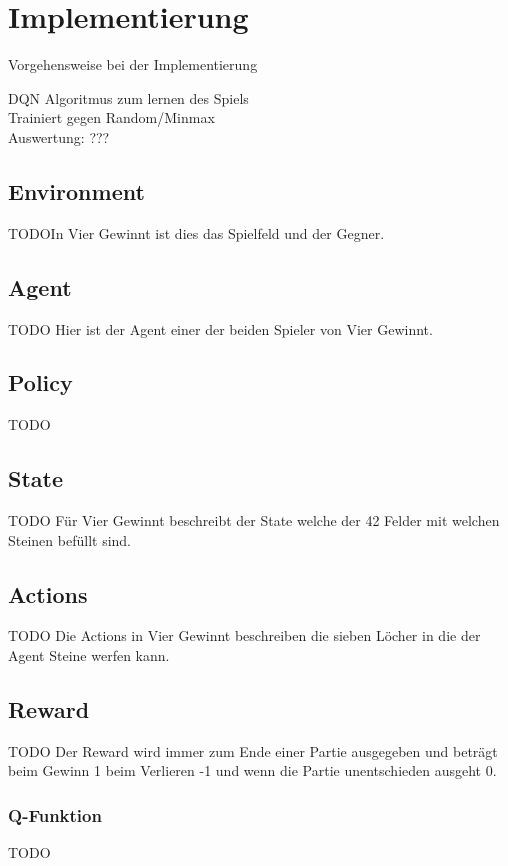 \chapter{Implementierung}%

\label{cha:Implementierung}

Vorgehensweise bei der Implementierung

\colorbox{red!30}{DQN Algoritmus zum lernen des Spiels}\\
\colorbox{red!30}{Trainiert gegen Random/Minmax}\\
\colorbox{red!30}{Auswertung: ???}\\


\section{Environment}
\colorbox{red!30}{TODO}In Vier Gewinnt ist dies das Spielfeld und der Gegner. 

\section{Agent}
\colorbox{red!30}{TODO} Hier ist der Agent einer der beiden Spieler von Vier Gewinnt.

\section{Policy}
\colorbox{red!30}{TODO}

\section{State}
\colorbox{red!30}{TODO} Für Vier Gewinnt beschreibt der State welche der 42 Felder mit welchen Steinen befüllt sind. 

\section{Actions}
\colorbox{red!30}{TODO} Die Actions in Vier Gewinnt beschreiben die sieben Löcher in die der Agent Steine werfen kann.

\section{Reward}
\colorbox{red!30}{TODO} Der Reward wird immer zum Ende einer Partie ausgegeben und beträgt beim Gewinn 1 beim Verlieren -1 und wenn die Partie unentschieden ausgeht 0.

\subsection{Q-Funktion}
\colorbox{red!30}{TODO} %